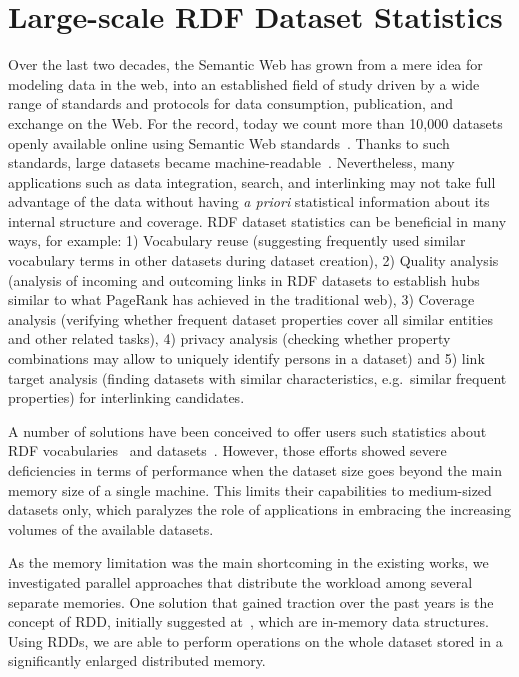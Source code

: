 \chapter{Large-scale RDF Dataset Statistics}
\label{chapter:dist_lod_stats}

Over the last two decades, the Semantic Web has grown from a mere idea for modeling data in the web, into an established field of study driven by a wide range of standards and protocols for data consumption, publication, and exchange on the Web.
For the record, today we count more than 10,000 datasets openly available online using Semantic Web standards~.
Thanks to such standards, large datasets became machine-readable~\cite{rw2014}.
Nevertheless, many applications such as data integration, search, and interlinking may not take full advantage of the data without having \textit{a priori} statistical information about its internal structure and coverage. 
\gls{RDF} dataset statistics can be beneficial in many ways, for example: 1) Vocabulary reuse (suggesting frequently used similar vocabulary terms in other datasets during dataset creation), 2) Quality analysis (analysis of incoming and outcoming links in \gls{RDF} datasets to establish hubs similar to what PageRank has achieved in the traditional web), 3) Coverage analysis (verifying whether frequent dataset properties cover all similar entities and other related tasks), 4) privacy analysis (checking whether property combinations may allow to uniquely identify persons in a dataset) and 5) link target analysis (finding datasets with similar characteristics, e.g.~similar frequent properties) for interlinking candidates.

A number of solutions have been conceived to offer users such statistics about \gls{RDF} vocabularies~\cite{vandenbussche2015linked} and datasets~\cite{conf/dexaw/LangeggerW09,ermilov-2013-kesw}.
However, those efforts showed severe deficiencies in terms of performance when the dataset size goes beyond the main memory size of a single machine.
This limits their capabilities to medium-sized datasets only, which paralyzes the role of applications in embracing the increasing volumes of the available datasets.

As the memory limitation was the main shortcoming in the existing works, we investigated parallel approaches that distribute the workload among several separate memories.
One solution that gained traction over the past years is the concept of \gls{RDD}, initially suggested at~\cite{zaharia2012resilient}, which are in-memory data structures. 
Using \gls{RDD}s, we are able to perform operations on the whole dataset stored in a significantly enlarged distributed memory.

